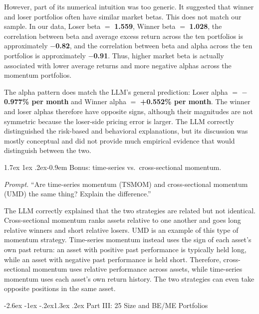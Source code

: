 \documentclass[11pt]{article}
\makeatletter
\renewcommand\section{\@startsection{section}{1}{0pt}%
  {-2.6ex \@plus -1ex \@minus -.2ex}{1.3ex \@plus .2ex}%
  {\normalfont\scshape\large\color{psink}}}   %
\renewcommand\paragraph{\@startsection{paragraph}{4}{0pt}%
  {1.7ex \@plus 1ex \@minus .2ex}{-0.9em}%
  {\normalfont\bfseries\normalsize\color{psink}}}
\makeatother
\begin{document}
However, part of its numerical intuition was too generic. It suggested that
winner and loser portfolios often have similar market betas. This does not
match our sample. In our data, Loser beta $=$ \textbf{1.559}, Winner beta
$=$ \textbf{1.028}, the correlation between beta and average excess return
across the ten portfolios is approximately \textbf{$-$0.82}, and the
correlation between beta and alpha across the ten portfolios is
approximately \textbf{$-$0.91}. Thus, higher market beta is actually
associated with lower average returns and more negative alphas across the
momentum portfolios.

The alpha pattern does match the LLM's general prediction: Loser alpha $=$
\textbf{$-$0.977\% per month} and Winner alpha $=$ \textbf{+0.552\% per
month}. The winner and loser alphas therefore have opposite signs, although
their magnitudes are not symmetric because the loser-side pricing error is
larger. The LLM correctly distinguished the risk-based and behavioral
explanations, but its discussion was mostly conceptual and did not provide
much empirical evidence that would distinguish between the two.

\paragraph{Bonus: time-series vs.\ cross-sectional momentum.}

\textit{Prompt.} ``Are time-series momentum (TSMOM) and cross-sectional
momentum (UMD) the same thing? Explain the difference.''

The LLM correctly explained that the two strategies are related but not
identical. Cross-sectional momentum ranks assets relative to one another and
goes long relative winners and short relative losers. UMD is an example of
this type of momentum strategy. Time-series momentum instead uses the sign
of each asset's own past return: an asset with positive past performance is
typically held long, while an asset with negative past performance is held
short. Therefore, cross-sectional momentum uses relative performance across
assets, while time-series momentum uses each asset's own return history. The
two strategies can even take opposite positions in the same asset.


\section{Part III: 25 Size and BE/ME Portfolios}
\end{document}
